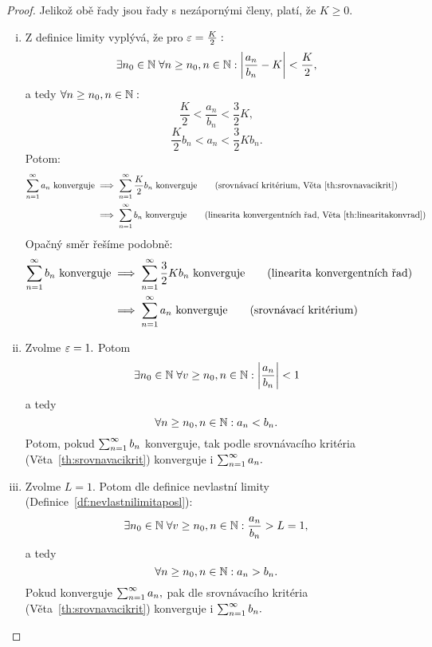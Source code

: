 \begin{proof}
    Jelikož obě řady jsou řady s nezápornými členy, platí, že $K \geq 0.$
    \begin{enumerate}[(i)]
        \item Z definice limity vyplývá, že pro $\varepsilon = \frac{K}{2}:$
            $$\exists n_0 \in \mathbb{N} \; \forall n \geq n_0, n\in\mathbb{N}: \left|\frac{a_n}{b_n}
            -K\right| < \frac{K}{2},$$
            a tedy $\forall n \geq n_0, n\in\mathbb{N}:$ 
            $$\frac{K}{2} < \frac{a_n}{b_n} < \frac{3}{2}K,$$
            $$\frac{K}{2}b_n < a_n < \frac{3}{2}Kb_n.$$
            Potom: 
            \begin{align*}
                \rada{a_n} \text{ konverguje} 
                &\implies \rada{\frac{K}{2}b_n} \text{ konverguje}
                    \tag{srovnávací kritérium, Věta~\ref{th:srovnavacikrit}} \\
                &\implies \rada{b_n} \text{ konverguje}
                    \tag{linearita konvergentních řad, 
                    Věta~\ref{th:linearitakonvrad}}
            \end{align*}
            Opačný směr řešíme podobně: 
            \begin{align*}
                \sum_{n=1}^\infty b_n \text{ konverguje} 
                &\implies \sum_{n=1}^\infty \frac{3}{2}Kb_n \text{ konverguje}
                    \tag{linearita konvergentních řad} \\
                &\implies \sum_{n=1}^\infty a_n \text{ konverguje}
                   \tag{srovnávací kritérium}
            \end{align*}

        \item Zvolme $\varepsilon = 1.$ Potom
            $$\exists n_0 \in \mathbb{N}\; \forall v \geq n_0, n\in\mathbb{N}: \left|\frac{a_n}{b_n}\right| < 1$$
            a tedy
            $$\forall n \geq n_0, n\in\mathbb{N}: a_n < b_n.$$
            Potom, pokud $\sum_{n=1}^\infty b_n$ konverguje, tak podle srovnávacího kritéria
            (Věta~\ref{th:srovnavacikrit}) konverguje i $\sum_{n=1}^\infty a_n.$

        \item Zvolme $L = 1.$ Potom dle definice nevlastní limity 
            (Definice~\ref{df:nevlastnilimitaposl}):
            $$\exists n_0 \in \mathbb{N}\; \forall v \geq n_0, n\in\mathbb{N}: \frac{a_n}{b_n} > L = 1,$$
            a tedy
            $$\forall n \geq n_0, n\in\mathbb{N}: a_n > b_n.$$
            Pokud konverguje $\sum_{n=1}^\infty a_n,$ pak dle srovnávacího kritéria 
            (Věta~\ref{th:srovnavacikrit}) konverguje i $\sum_{n=1}^\infty b_n.$
    \end{enumerate}
\end{proof}

